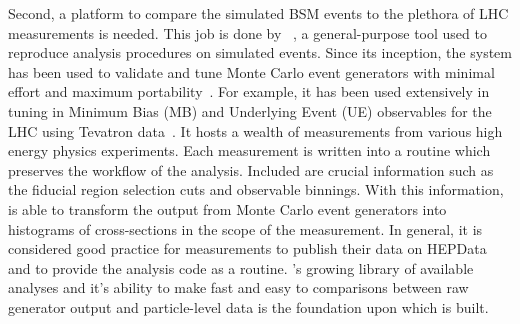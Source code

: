 Second, a platform to compare the simulated BSM events to the plethora of LHC measurements is needed. This job is done by \rivet~\cite{Buckley:2010ar}, a general-purpose tool used to reproduce analysis procedures on simulated events. Since its inception, the \rivet system has been used to validate and tune Monte Carlo event generators with minimal effort and maximum portability~\cite{Buckley:2010ar}. For example, it has been used extensively in tuning in Minimum Bias (MB) and Underlying Event (UE) observables for the LHC using Tevatron data~\cite{Jon_meetings}. It hosts a wealth of measurements from various high energy physics experiments. Each measurement is written into a \rivet routine which preserves the workflow of the analysis. Included are crucial information such as the fiducial region selection cuts and observable binnings. With this information, \rivet is able to transform the output from Monte Carlo event generators into histograms of cross-sections in the scope of the measurement. In general, it is considered good practice for \LHC measurements to publish their data on HEPData~\cite{Maguire:2017ypu} and to provide the analysis code as a \rivet routine. \rivet's growing library of available analyses and it's ability to make fast and easy to comparisons between raw generator output and particle-level data is the foundation upon which \contur is built. 

